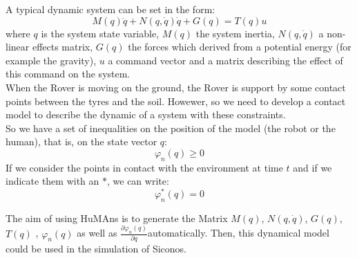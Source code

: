 A typical dynamic system can be set in the form:
$$
M(q) \ddot{q} + N(q,\dot{q}) \dot{q} + G(q) = T(q) u
$$
where $q$ is the system state variable, $M(q)$ the system inertia,
$N(q,\dot{q})$ a non-linear effects matrix, $G(q)$ the forces which derived from a potential energy (for example the gravity), $u$ a command vector and a matrix
describing the effect of this command on the system. \\ 

When the Rover is moving on the ground, the Rover is support by some contact points between the tyres and the soil. Howewer, so we need to develop a contact model to describe the dynamic of a system
with these constraints.\\

So we have a set of inequalities on the position
of the model (the robot or the human), that is, on the state vector
$q$:
$$
\varphi_n(q) \geq 0
$$
If we consider the points in contact with the environment at time $t$
and if we indicate them with an $*$, we can write:
$$
\varphi_n^*(q) = 0
$$


The aim of using HuMAns is to generate the Matrix $M(q)$, $N(q,\dot{q})$, $G(q)$, $T(q)$ , $\varphi_n(q)$ as well as $\frac{\partial \varphi_n(q)}{\partial q}$automatically. Then, this dynamical model could be used in the simulation of Siconos.

%







